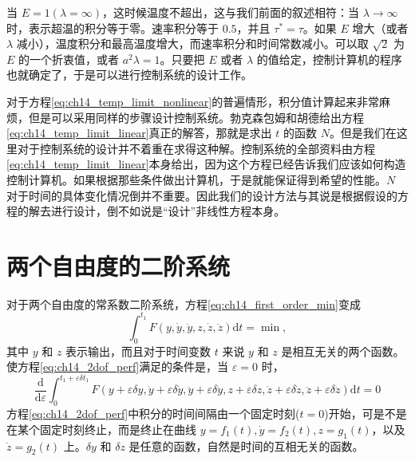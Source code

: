 当 $E=1(\lambda=\infty)$，这时候温度不超出，这与我们前面的叙述相符：当 $\lambda\to\infty$ 时，表示超温的积分等于零。速率积分等于 $0.5$，并且 $\tau^*=\tau$。如果 $E$ 增大（或者 $\lambda$ 减小），温度积分和最高温度增大，而速率积分和时间常数减小。可以取 $\sqrt{2}$ 为 $E$ 的一个折衷值，或者 $a^2\lambda=1$。只要把 $E$ 或者 $\lambda$ 的值给定，控制计算机的程序也就确定了，于是可以进行控制系统的设计工作。

对于方程\eqref{eq:ch14_temp_limit_nonlinear}的普遍情形，积分值计算起来非常麻烦，但是可以采用同样的步骤设计控制系统。勃克森包姆和胡德给出方程\eqref{eq:ch14_temp_limit_linear}真正的解答，那就是求出 $t$ 的函数 $N$。但是我们在这里对于控制系统的设计并不着重在求得这种解。控制系统的全部资料由方程\eqref{eq:ch14_temp_limit_linear}本身给出，因为这个方程已经告诉我们应该如何构造控制计算机。如果根据那些条件做出计算机，于是就能保证得到希望的性能。$N$ 对于时间的具体变化情况倒并不重要。因此我们的设计方法与其说是根据假设的方程的解去进行设计，倒不如说是“设计”非线性方程本身。

\section{两个自由度的二阶系统}
对于两个自由度的常系数二阶系统，方程\eqref{eq:ch14_first_order_min}变成
\begin{equation}
\int_{0}^{t_1} F(y,\dot{y},\ddot{y},z,\dot{z},\ddot{z})\mathrm{d}t = \min,
\label{eq:ch14_2dof_perf}
\end{equation}
其中 $y$ 和 $z$ 表示输出，而且对于时间变数 $t$ 来说 $y$ 和 $z$ 是相互无关的两个函数。使方程\eqref{eq:ch14_2dof_perf}满足的条件是，当 $\varepsilon=0$ 时，
\begin{equation}
\frac{\mathrm{d}}{\mathrm{d}\varepsilon}\int_{0}^{t_1+\varepsilon\delta t_1}
F(y+\varepsilon\delta y,\dot{y}+\varepsilon\delta\dot{y},\ddot{y}+\varepsilon\delta\ddot{y},
z+\varepsilon\delta z,\dot{z}+\varepsilon\delta\dot{z},\ddot{z}+\varepsilon\delta\ddot{z})\mathrm{d}t = 0
\label{eq:ch14_2dof_var_def}
\end{equation}
方程\eqref{eq:ch14_2dof_perf}中积分的时间间隔由一个固定时刻($t=0$)开始，可是不是在某个固定时刻终止，而是终止在曲线 $y=f_1(t),\dot{y}=f_2(t),z=g_1(t)$，以及 $\dot{z}=g_2(t)$ 上。$\delta y$ 和 $\delta z$ 是任意的函数，自然是时间的互相无关的函数。

